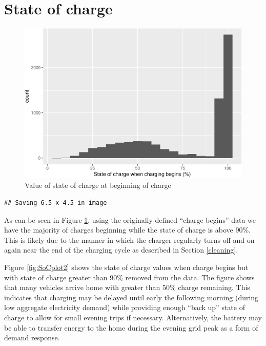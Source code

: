 \documentclass[]{article}
\begin{document}
\section{State of charge}\label{SoC}

\begin{figure}
\centering
\includegraphics{EVBB_report_files/figure-latex/SoCplot1-1.pdf}
\caption{\label{fig:SoCplot1}Value of state of charge at beginning of
charge}
\end{figure}

\begin{verbatim}
## Saving 6.5 x 4.5 in image
\end{verbatim}

As can be seen in Figure \ref{fig:SoCplot1}, using the originally
defined ``charge begins'' data we have the majority of charges beginning
while the state of charge is above 90\%. This is likely due to the
manner in which the charger regularly turns off and on again near the
end of the charging cycle as described in Section \ref{cleaning}.

Figure \ref{fig:SoCplot2} shows the state of charge values when charge
begins but with state of charge greater than 90\% removed from the data.
The figure shows that many vehicles arrive home with greater than 50\%
charge remaining. This indicates that charging may be delayed until
early the following morning (during low aggregate electricity demand)
while providing enough ``back up'' state of charge to allow for small
evening trips if necessary. Alternatively, the battery may be able to
transfer energy to the home during the evening grid peak as a form of
demand response.
\end{document}
